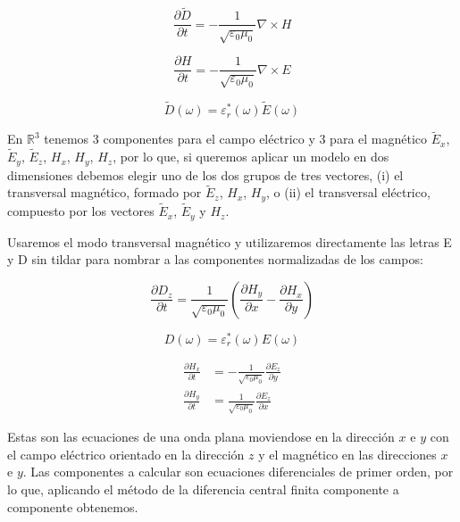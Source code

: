 \documentclass[11pt,a4paper,twoside,pdf]{article}
\numberwithin{equation}{section}
\begin{document}
\begin{equation}
\frac{\partial \tilde{D}}{\partial t}=-\frac{1}{\sqrt{\varepsilon_{0}\mu_{0}}}\nabla \times H
\end{equation}

\begin{equation}
\frac{\partial H}{\partial t}=-\frac{1}{\sqrt{\varepsilon_{0}\mu_{0}}}\nabla \times E
\end{equation}

\begin{equation}
\tilde{D}(\omega)=\varepsilon^*_{r}(\omega)\tilde{E}(\omega)
\end{equation}


En $\mathbb R^{3}$ tenemos 3 componentes para el campo eléctrico y 3 para el magnético $\tilde{E}_{x}$, $\tilde{E}_{y}$, $\tilde{E}_{z}$, $H_{x}$, $H_{y}$, $H_{z}$, por lo que, si queremos aplicar un modelo en dos dimensiones debemos elegir uno de los dos grupos de tres vectores, (i) el transversal magnético, formado por $\tilde{E}_{z}$, $H_{x}$, $H_{y}$, o (ii) el transversal eléctrico, compuesto por los vectores $\tilde{E}_{x}$, $\tilde{E}_{y}$ y $H_{z}$.

Usaremos el modo transversal magnético y utilizaremos directamente las letras E y D sin tildar para nombrar a las componentes normalizadas de los campos:

\begin{equation}
\frac{\partial D_{z}}{\partial t}=\frac{1}{\sqrt{\varepsilon_{0}\mu_{0}}}\left(\frac{\partial H_{y}}{\partial x}-\frac{\partial H_{x}}{\partial y}\right)
\end{equation}

\begin{equation}
{D}(\omega)=\varepsilon^*_{r}(\omega)E(\omega)
\end{equation}

\begin{align}
\frac{\partial H_{x}}{\partial t} &= -\frac{1}{\sqrt{\varepsilon_{0}\mu_{0}}}\frac{\partial E_{z}}{\partial y} \nonumber \\
\frac{\partial H_{y}}{\partial t} &=  \frac{1}{\sqrt{\varepsilon_{0}\mu_{0}}}\frac{\partial E_{z}}{\partial x}
\end{align}

Estas son las ecuaciones de una onda plana moviendose en la dirección $x$ e $y$ con el campo eléctrico orientado en la dirección $z$ y el magnético en las direcciones $x$ e $y$. Las componentes a calcular son ecuaciones diferenciales de primer orden, por lo que, aplicando el método de la diferencia central finita componente a componente obtenemos.
\end{document}
